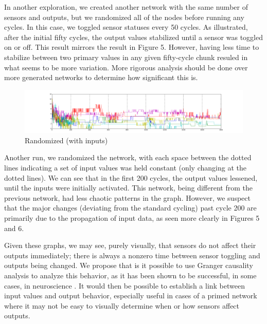 \documentclass[12pt]{article}
\begin{document}
In another exploration, we created another network with the same number of sensors and outputs, but we randomized all of the nodes before running any cycles.  In this case, we toggled sensor statuses every 50 cycles.  As illustrated, after the initial fifty cycles, the output values stabilized until a sensor was toggled on or off.  This result mirrors the result in Figure 5.  However, having less time to stabilize between two primary values in any given fifty-cycle chunk resuled in what seems to be more variation.  More rigorous analysis should be done over more generated networks to determine how significant this is.

\begin{figure}[H]
    \includegraphics[width=\linewidth]{../visualizations/8knodes_sensors_lineannotated.png}
    \caption{Randomized (with inputs)}
\end{figure}

Another run, we randomized the network, with each space between the dotted lines indicating a set of input values was held constant (only changing at the dotted lines).  We can see that in the first 200 cycles, the output values lessened, until the inputs were initially activated.  This network, being different from the previous network, had less chaotic patterns in the graph.  However, we suspect that the major changes (deviating from the standard cycling) past cycle 200 are primarily due to the propagation of input data, as seen more clearly in Figures 5 and 6.

Given these graphs, we may see, purely visually, that sensors do not affect their outputs immediately; there is always a nonzero time between sensor toggling and outputs being changed.  We propose that is it possible to use Granger causality analysis to analyze this behavior, as it has been shown to be successful, in some cases, in neuroscience \cite{neurocausality, netcausality}.  It would then be possible to establish a link between input values and output behavior, especially useful in cases of a primed network where it may not be easy to visually determine when or how sensors affect outputs.

\end{document}
